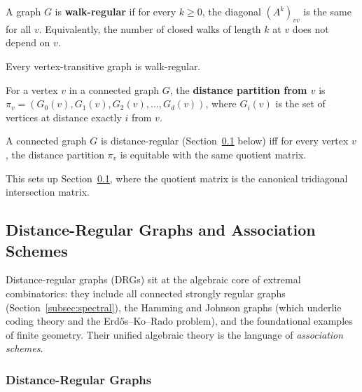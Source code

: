 \begin{definition}
A graph $G$ is \textbf{walk-regular} if for every $k \ge 0$, the
diagonal $(A^k)_{vv}$ is the same for all $v$. Equivalently, the number
of closed walks of length $k$ at $v$ does not depend on $v$.
\end{definition}

\begin{theorem}
Every vertex-transitive graph is walk-regular.
\end{theorem}

\begin{definition}
For a vertex $v$ in a connected graph $G$, the \textbf{distance
partition from $v$} is
$\pi_v = (G_0(v), G_1(v), G_2(v), \ldots, G_d(v))$, where $G_i(v)$ is
the set of vertices at distance exactly $i$ from $v$.
\end{definition}

\begin{theorem}\label{thm:drgequit}
A connected graph $G$ is distance-regular (Section~\ref{subsec:drg}
below) iff for every vertex $v$, the distance partition $\pi_v$ is
equitable with the same quotient matrix.
\end{theorem}

This sets up Section~\ref{subsec:drg}, where the quotient matrix is
the canonical tridiagonal intersection matrix.

\subsection{Distance-Regular Graphs and Association Schemes}\label{subsec:drg}

Distance-regular graphs (DRGs) sit at the algebraic core of extremal
combinatorics: they include all connected strongly regular graphs (Section~\ref{subsec:spectral}),
the Hamming and Johnson graphs (which underlie coding theory and
the Erd\H{o}s--Ko--Rado problem), and the foundational examples of
finite geometry. Their unified algebraic theory is the language of
\emph{association schemes}.

\subsubsection{Distance-Regular Graphs}

